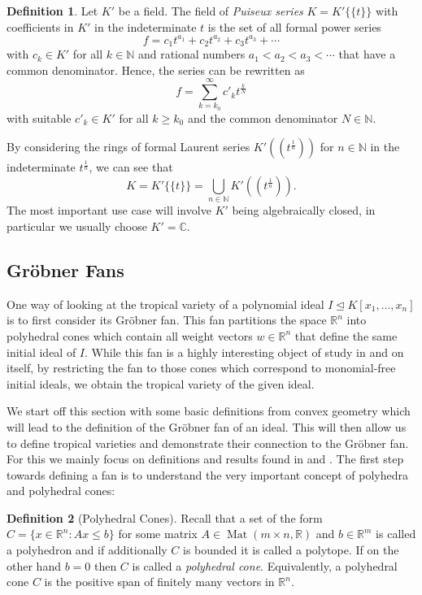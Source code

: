 \documentclass[
  paper=a4,
  DIV=14,
  fontsize=12pt,
  titlepage,
  bibliography=totoc,
  listof=totoc,
  pagesize=pdftex
]{scrartcl}
\numberwithin{figure}{section}
\numberwithin{equation}{section}
\numberwithin{table}{section}
\newcommand*\setR{\mathds{R}}
\newcommand*\setC{\mathds{C}}
\newcommand*\setN{\mathds{N}}
\newcommand*\puiseux[2]{#1\{\!\{#2\}\!\}}
\let\idealof\trianglelefteq
\DeclareMathOperator{\Mat}{Mat}
\theoremstyle{definition}
\newtheorem{definition}{Definition}
\numberwithin{definition}{section}
\begin{document}
\begin{definition}
  Let $K'$ be a field. The field of \emph{Puiseux series} $K = \puiseux{K'}{t}$ with
  coefficients in $K'$ in the indeterminate $t$ is the set of all formal power series
  \[
    f = c_1 t^{a_1} + c_2 t^{a_2} + c_3 t^{a_3} + \cdots
  \]
  with $c_k \in K'$ for all $k \in \setN$ and rational numbers $a_1 < a_2 < a_3 < \cdots$
  that have a common denominator. Hence, the series can be rewritten as
  \[
    f = \sum_{k = k_0}^\infty c'_k t^{\frac kN}
  \]
  with suitable $c'_k \in K'$ for all $k\geq k_0$ and the common denominator $N \in
  \setN$.
  \label{def:puiseux}
\end{definition}

By considering the rings of formal Laurent series $K'((t^{\frac1n}))$ for $n \in \setN$ in
the indeterminate $t^{\frac1n}$, we can see that
\[
  K = \puiseux{K'}t = \bigcup_{n \in \setN} K'((t^{\frac1n})).
\]
The most important use case will involve $K'$ being algebraically closed, in particular we
usually choose $K'=\setC$.

\subsection{Gröbner Fans}

One way of looking at the tropical variety of a polynomial ideal $I \idealof K[x_1, \dots,
x_n]$ is to first consider its Gröbner fan. This fan partitions the space $\setR^n$ into
polyhedral cones which contain all weight vectors $w\in \setR^n$ that define the same
initial ideal of $I$. While this fan is a highly interesting object of study in and on
itself, by restricting the fan to those cones which correspond to monomial-free initial
ideals, we obtain the tropical variety of the given ideal.

We start off this section with some basic definitions from convex geometry which will lead
to the definition of the Gröbner fan of an ideal. This will then allow us to define
tropical varieties and demonstrate their connection to the Gröbner fan. For this we mainly
focus on definitions and results found in \cite{compGrobFan} and \cite{SturmGBCP}. The
first step towards defining a fan is to understand the very important concept of polyhedra
and polyhedral cones:

\begin{definition}[Polyhedral Cones]
  Recall that a set of the form $C = \{ x \in \setR^n : Ax \leq b \}$ for some matrix $A
  \in \Mat(m\times n, \setR)$ and $b \in \setR^m$ is called a polyhedron and if
  additionally $C$ is bounded it is called a polytope. If on the other hand $b=0$ then $C$
  is called a \emph{polyhedral cone}. Equivalently, a polyhedral cone $C$ is the positive
  span of finitely many vectors in $\setR^n$.
  \label{def:polyhedralCone}
\end{definition}
\end{document}
